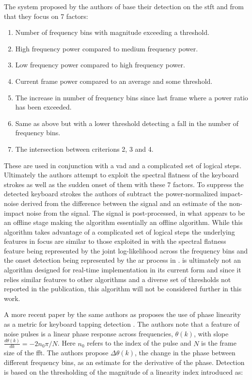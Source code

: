The system proposed by the authors of \cite{Sugiyama2007} base their detection on the \gls{stft} and from that they focus on 7 factors:
\begin{enumerate}
\item Number of frequency bins with magnitude exceeding a threshold.
\item High frequency power compared to medium frequency power.
\item Low frequency power compared to high frequency power.
\item Current frame power compared to an average and some threshold.
\item The increase in number of frequency bins since last frame where a power ratio has been exceeded.
\item Same as above but with a lower threshold detecting a fall in the number of frequency bins.
\item The intersection between criterions 2, 3 and 4.
\end{enumerate}
These are used in conjunction with a \gls{vad} and a complicated set of logical steps. Ultimately the authors attempt to exploit the spectral flatness of the keyboard strokes as well as the sudden onset of them with these 7 factors.
To suppress the detected keyboard strokes the authors of \cite{Sugiyama2007} subtract the power-normalized impact-noise derived from the difference between the signal and an estimate of the non-impact noise from the signal. The signal is post-processed, in what appears to be an offline stage making the algorithm essentially an offline algorithm. While this algorithm takes advantage of a complicated set of logical steps the underlying features in focus are similar to those exploited in \cite{Subramanya2007} with the spectral flatness feature being represented by the joint log-likelihood across the frequency bins and the onset detection being represented by the \gls{ar} process in \cite{Subramanya2007}. \cite{Sugiyama2007} is ultimately not an algorithm designed for real-time implementation in its current form and since it relies similar features to other algorithms and a diverse set of thresholds not reported in the publication, this algorithm will not be considered further in this work.

A more recent paper by the same authors as \cite{Sugiyama2007} proposes the use of phase linearity as a metric for keyboard tapping detection \cite{Sugiyama2013}. The authors note that a feature of noise pulses is a linear phase response across frequencies, $\theta(k)$, with slope $ \frac{d\theta(k)}{dk} = -2n_0\pi /N$. Here $n_0$ refers to the index of the pulse and $N$ is the frame size of the \gls{fft}. The authors propose $\Delta \theta(k)$, the change in the phase between different frequency bins, as an estimate for the derivative of the phase. Detection is based on the thresholding of the magnitude of a linearity index introduced as:


